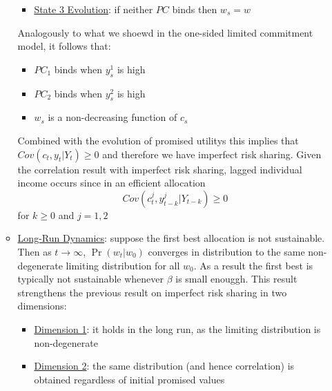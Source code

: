 \documentclass{article}
\begin{document}
\begin{itemize}
\begin{itemize}
\begin{itemize}
            \item  \underline{State 3 Evolution}: if neither $PC$ binds then $w_{s} = w$
        \end{itemize}
        Analogously to what we shoewd in the one-sided limited commitment model, it follows that:
        \begin{itemize}
            \item  $PC_{1}$ binds when $y_{s}^{1}$ is high
            \item  $PC_{2}$ binds when $y_{s}^{2}$ is high
            \item  $w_{s}$ is a non-decreasing function of $c_{s}$
        \end{itemize}
        Combined with the evolution of promised utilitys this implies that $Cov(c_{t}, y_{t} | Y_{t}) \geq 0$ and therefore we have imperfect risk sharing. Given the correlation result with imperfect risk sharing, lagged individual income occurs since in an efficient allocation $$Cov(c_{t}^{j}, y_{t-k}^{j} | Y_{t-k}) \geq 0$$ for $k \geq 0$ and $j = 1,2$
        \item \underline{Long-Run Dynamics}: suppose the first best allocation is not sustainable. Then as $t \rightarrow \infty$, $\Pr(w_{t} | w_{0})$ converges in distribution to the same non-degenerate limiting distribution for all $w_{0}$.
        As a result the first best is typically not sustainable whenever $\beta$ is small enouggh. This result strengthens the previous result on imperfect risk sharing in two dimensions:
        \begin{itemize}
            \item  \underline{Dimension 1}: it holds in the long run, as the limiting distribution is non-degenerate
            \item  \underline{Dimension 2}: the same distribution (and hence correlation) is obtained regardless of initial promised values
        \end{itemize}
    \end{itemize}
\end{itemize}
\end{document}
